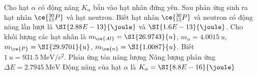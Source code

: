 \begin{ex}
	Cho hạt $\alpha$  có động năng $K_{\alpha}$  bắn vào hạt nhân   đứng yên. Sau phản ứng sinh ra hạt nhân $\ce{^{30}_{15}P}$  và hạt neutron. Biết hạt nhân $\ce{^{30}_{15}P}$  và neutron có động năng lần lượt là $\SI{2.88E-13}{\joule}$  và $\SI{1.6E-13}{\joule}$. Cho khối lượng các hạt nhân là $m_{\ce{Al}}=\SI{26.9743}{u}$, $m_{\alpha}=\SI{4.0015}{u}$, $m_{\ce{P}}=\SI{29.9701}{u}$, $m_{\ce{n}}=\SI{1.0087}{u}$. Biết $\SI{1}{u}=\SI{931.5}{\mega\electronvolt/c^2}$.
	{Phản ứng tỏa năng lượng}
	{\True Năng lượng phản ứng $\Delta E=\SI{2.7945}{\mega\electronvolt}$}
	{\True Động năng của hạt $\alpha$ là $K_{\alpha}=\SI{8.8E-16}{\joule}$}
\end{ex}
